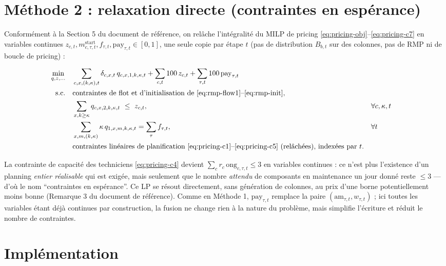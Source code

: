 \documentclass[11pt]{article}
\begin{document}
\section{Méthode 2 : relaxation directe (contraintes en espérance)}

Conformément à la Section 5 du document de référence, on relâche l'intégralité du MILP de pricing
\eqref{eq:pricing-obj}--\eqref{eq:pricing-c7} en variables continues $z_{c,t},m^{\text{start}}_{c,\tau,t},
f_{\tau,t},\mathrm{pay}_{\tau,t}\in[0,1]$, une seule copie par étape $t$ (pas de distribution $B_{b,t}$ sur
des colonnes, pas de RMP ni de boucle de pricing) :

\begin{align}
\min_{q,z,\dots}\quad & \sum_{c,x,(k,\kappa),t} \delta_{c,x,t}\, q_{c,x,1,k,\kappa,t} + \sum_{c,t}
100\, z_{c,t} + \sum_{\tau,t} 100\,\mathrm{pay}_{\tau,t} \label{eq:relax-obj}\\
\text{s.c.}\quad & \text{contraintes de flot et d'initialisation de } \eqref{eq:rmp-flow1}\text{--}
\eqref{eq:rmp-init}, \nonumber\\
 & \sum_{x,k\ge\kappa} q_{c,x,2,k,\kappa,t} \ \le\ z_{c,t}, && \forall c,\kappa,t \label{eq:relax-c1}\\
 & \sum_{x,m,(k,\kappa)} \kappa\, q_{1,x,m,k,\kappa,t} = \sum_\tau f_{\tau,t}, && \forall t
 \label{eq:relax-c2}\\
 & \text{contraintes linéaires de planification } \eqref{eq:pricing-c1}\text{--}\eqref{eq:pricing-c5}
 \text{ (relâchées), indexées par } t. \nonumber
\end{align}

La contrainte de capacité des techniciens \eqref{eq:pricing-c4} devient $\sum_c r_c\,\mathrm{ong}_{c,\tau,t}
\le 3$ en variables continues : ce n'est plus l'existence d'un planning \emph{entier réalisable} qui est
exigée, mais seulement que le nombre \emph{attendu} de composants en maintenance un jour donné reste
$\le3$ --- d'où le nom ``contraintes en espérance''. Ce LP se résout directement, sans génération de
colonnes, au prix d'une borne potentiellement moins bonne (Remarque 3 du document de référence). Comme en
Méthode 1, $\mathrm{pay}_{\tau,t}$ remplace la paire $(\mathrm{am}_{\tau,t},w_{\tau,t})$ ; ici toutes les
variables étant déjà continues par construction, la fusion ne change rien à la nature du problème, mais
simplifie l'écriture et réduit le nombre de contraintes.

\section{Implémentation}
\end{document}
